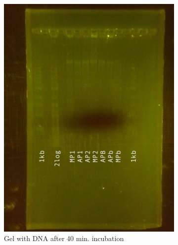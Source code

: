 \begin{figure}[H]
\begin{subfigure}[b]{0.24\textwidth}
        \includegraphics[width=\textwidth]{graphics/pic/20180316_gel_dna_sybr_gold2.JPG}
        \caption{Gel with DNA after 40 min. incubation}
        \label{sfig:20180316_gel_dna_sybr_gold2}
    \end{subfigure}
    ~
     \begin{subfigure}[b]{0.24\textwidth}

\end{subfigure}
\end{figure}

